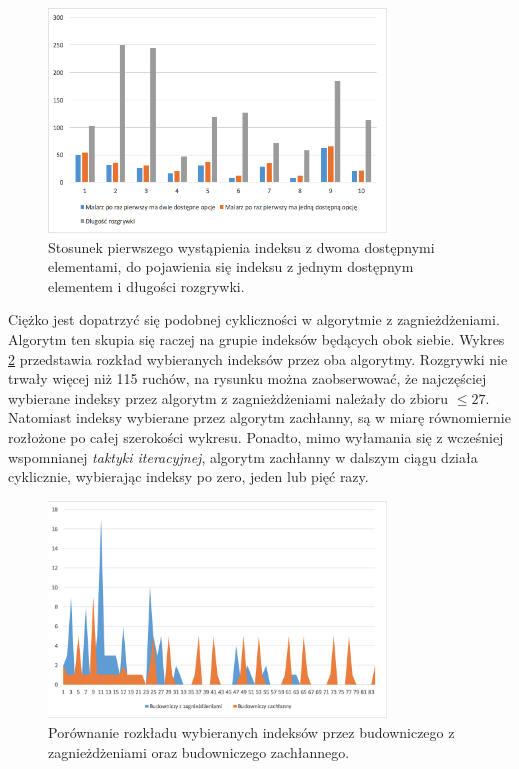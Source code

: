 \documentclass[document]{xmgr}
\begin{document}
\begin{figure}[tbh]
    \centering
    \includegraphics[width = 0.8\textwidth]{images/builder0efficiency}
    \caption{Stosunek pierwszego wystąpienia indeksu z dwoma dostępnymi elementami, do pojawienia się indeksu z jednym dostępnym elementem i długości rozgrywki.}
    \label{fig:builder0Efficiency}
\end{figure}

Ciężko jest dopatrzyć się podobnej cykliczności w algorytmie z zagnieżdżeniami. Algorytm ten skupia się raczej na grupie indeksów będących obok siebie. Wykres \ref{fig:buildersPickedIndexes} przedstawia rozkład wybieranych indeksów przez oba algorytmy. Rozgrywki nie trwały więcej niż 115 ruchów, na rysunku można zaobserwować, że najczęściej wybierane indeksy przez algorytm z zagnieżdżeniami należały do zbioru $\leq 27$. Natomiast indeksy wybierane przez algorytm zachłanny, są w miarę równomiernie rozłożone po całej szerokości wykresu. Ponadto, mimo wyłamania się z wcześniej wspomnianej \textit{taktyki iteracyjnej}, algorytm zachłanny w dalszym ciągu działa cyklicznie, wybierając indeksy po zero, jeden lub pięć razy.

\begin{figure}[tbh]
    \centering
    \includegraphics[width = 0.8\textwidth]{images/buildersPickedIndexes}
    \caption{Porównanie rozkładu wybieranych indeksów przez budowniczego z zagnieżdżeniami oraz budowniczego zachłannego.}
    \label{fig:buildersPickedIndexes}
\end{figure}
\end{document}
